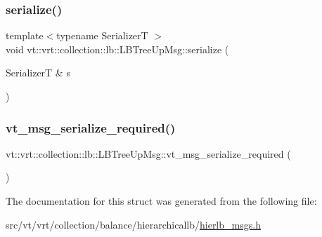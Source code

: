 \subsubsection{\texorpdfstring{serialize()}{serialize()}}
{\footnotesize\ttfamily template$<$typename SerializerT $>$ \\
void vt\+::vrt\+::collection\+::lb\+::\+L\+B\+Tree\+Up\+Msg\+::serialize (\begin{DoxyParamCaption}\item[{SerializerT \&}]{s }\end{DoxyParamCaption})\hspace{0.3cm}{\ttfamily [inline]}}

\mbox{\label{structvt_1_1vrt_1_1collection_1_1lb_1_1_l_b_tree_up_msg_af56129ab0f46796fb31785e0a573cb5d}} 
\subsubsection{\texorpdfstring{vt\+\_\+msg\+\_\+serialize\+\_\+required()}{vt\_msg\_serialize\_required()}}
{\footnotesize\ttfamily vt\+::vrt\+::collection\+::lb\+::\+L\+B\+Tree\+Up\+Msg\+::vt\+\_\+msg\+\_\+serialize\+\_\+required (\begin{DoxyParamCaption}{ }\end{DoxyParamCaption})}



The documentation for this struct was generated from the following file\+:\begin{DoxyCompactItemize}
\item 
src/vt/vrt/collection/balance/hierarchicallb/\hyperlink{hierlb__msgs_8h}{hierlb\+\_\+msgs.\+h}\end{DoxyCompactItemize}
